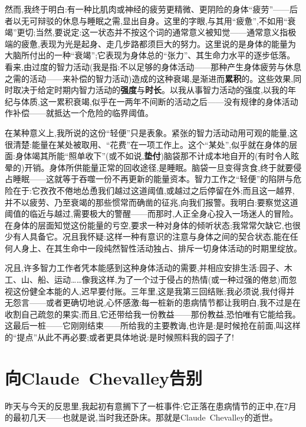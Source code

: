 然而,我终于明白:有一种比肌肉或神经的疲劳更精微、更阴险的身体“疲劳”——后者以无可辩驳的休息与睡眠之需,显出自身。这里的字眼,与其用“疲惫”,不如用“衰竭”更切;当然,要说定:这一状态并不按这个词的通常意义被知觉——通常意义指极端的疲惫,表现为光是起身、走几步路都须巨大的努力。这里说的是身体的能量为大脑所付出的一种“衰竭”;它表现为身体总的“张力”、其生命力水平的逐步低落。看来,由过度的智力活动(我是指:不以足够的身体活动——那种产生身体疲劳与休息之需的活动——来补偿的智力活动)造成的这种衰竭,是渐进而\textbf{累积}的。这些效果,同时取决于给定时期内智力活动的\textbf{强度}与\textbf{时长}。以我从事智力活动的强度,以我的年纪与体质,这一累积衰竭,似乎在一两年不间断的活动之后——没有规律的身体活动作补偿——就抵达一个危险的临界阈值。

在某种意义上,我所说的这份“轻便”只是表象。紧张的智力活动动用可观的能量,这很清楚:能量在某处被取用、“花费”在一项工作上。这个“某处”,似乎就在身体的层面:身体竭其所能“照单收下”(或不如说,\textbf{垫付})脑袋那不计成本地自开的(有时令人眩晕的)开销。身体所供能量正常的回收途径,是睡眠。脑袋一旦变得贪食,终于就要侵占睡眠——这就等于吞噬一份不再更新的能量资本。\dmark{}智力工作之“轻便”的陷阱与危险在于:它孜孜不倦地怂恿我们越过这道阈值,或越过之后停留在外;而且这一越界,并不以疲劳、乃至衰竭的那些惯常而确凿的征兆,向我们报警。我明白:要察觉这道阈值的临近与越过,需要极大的警醒——而那时,人正全身心投入一场迷人的冒险。在身体的层面知觉这份能量的亏空,要求一种对身体的倾听状态;我常常欠缺它,也很少有人具备它。况且我怀疑:这样一种有意识的注意与身体之间的契合状态,能在任何人身上、在其生命中一段纯然智性活动独占、排斥一切身体活动的时期里绽放。

况且,许多智力工作者凭本能感到这种身体活动的需要,并相应安排生活:园子、木工、山、船、运动……像我这样,为了一个过于侵占的热情(或一种过强的倦怠)而忽视这份健全本能的人,迟早要付账。三年里,这是我第三回结账;我必须说,我付得并无怨言——或者更确切地说,心怀感激:每一桩新的患病情节都让我明白,我不过是在收割自己疏忽的果实;而且,它还带给我一份教益——那份教益,恐怕唯有它能给我。这最后一桩——它刚刚结束——所给我的主要教诲,也许是:是时候抢在前面,叫这样的“提点”从此不再必要;或者更具体地说:是时候照料我的园子了!

\section{向Claude~Chevalley告别}


昨天与今天的反思里,我起初有意搁下了一桩事件:它正落在患病情节的正中,在7月的最初几天——也就是说,当时我还卧床。那就是Claude~Chevalley的逝世。

